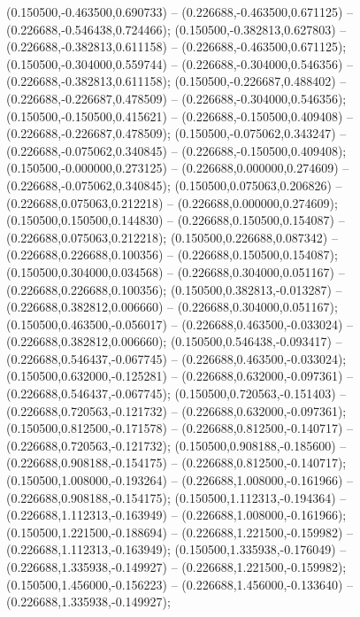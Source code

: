  (0.150500,-0.463500,0.690733) -- (0.226688,-0.463500,0.671125) -- (0.226688,-0.546438,0.724466);
 (0.150500,-0.382813,0.627803) -- (0.226688,-0.382813,0.611158) -- (0.226688,-0.463500,0.671125);
 (0.150500,-0.304000,0.559744) -- (0.226688,-0.304000,0.546356) -- (0.226688,-0.382813,0.611158);
 (0.150500,-0.226687,0.488402) -- (0.226688,-0.226687,0.478509) -- (0.226688,-0.304000,0.546356);
 (0.150500,-0.150500,0.415621) -- (0.226688,-0.150500,0.409408) -- (0.226688,-0.226687,0.478509);
 (0.150500,-0.075062,0.343247) -- (0.226688,-0.075062,0.340845) -- (0.226688,-0.150500,0.409408);
 (0.150500,-0.000000,0.273125) -- (0.226688,0.000000,0.274609) -- (0.226688,-0.075062,0.340845);
 (0.150500,0.075063,0.206826) -- (0.226688,0.075063,0.212218) -- (0.226688,0.000000,0.274609);
 (0.150500,0.150500,0.144830) -- (0.226688,0.150500,0.154087) -- (0.226688,0.075063,0.212218);
 (0.150500,0.226688,0.087342) -- (0.226688,0.226688,0.100356) -- (0.226688,0.150500,0.154087);
 (0.150500,0.304000,0.034568) -- (0.226688,0.304000,0.051167) -- (0.226688,0.226688,0.100356);
 (0.150500,0.382813,-0.013287) -- (0.226688,0.382812,0.006660) -- (0.226688,0.304000,0.051167);
 (0.150500,0.463500,-0.056017) -- (0.226688,0.463500,-0.033024) -- (0.226688,0.382812,0.006660);
 (0.150500,0.546438,-0.093417) -- (0.226688,0.546437,-0.067745) -- (0.226688,0.463500,-0.033024);
 (0.150500,0.632000,-0.125281) -- (0.226688,0.632000,-0.097361) -- (0.226688,0.546437,-0.067745);
 (0.150500,0.720563,-0.151403) -- (0.226688,0.720563,-0.121732) -- (0.226688,0.632000,-0.097361);
 (0.150500,0.812500,-0.171578) -- (0.226688,0.812500,-0.140717) -- (0.226688,0.720563,-0.121732);
 (0.150500,0.908188,-0.185600) -- (0.226688,0.908188,-0.154175) -- (0.226688,0.812500,-0.140717);
 (0.150500,1.008000,-0.193264) -- (0.226688,1.008000,-0.161966) -- (0.226688,0.908188,-0.154175);
 (0.150500,1.112313,-0.194364) -- (0.226688,1.112313,-0.163949) -- (0.226688,1.008000,-0.161966);
 (0.150500,1.221500,-0.188694) -- (0.226688,1.221500,-0.159982) -- (0.226688,1.112313,-0.163949);
 (0.150500,1.335938,-0.176049) -- (0.226688,1.335938,-0.149927) -- (0.226688,1.221500,-0.159982);
 (0.150500,1.456000,-0.156223) -- (0.226688,1.456000,-0.133640) -- (0.226688,1.335938,-0.149927);

